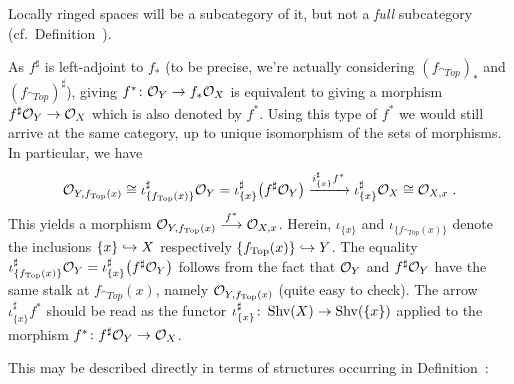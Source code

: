 \documentclass[a4paper,parskip=half,numbers=enddot, DIV=12]{scrreprt}
\begin{document}
\begin{rem*}
    Locally ringed spaces will be a subcategory of it, but not a \emph{full} subcategory (cf.\ Definition~).
\end{rem*}
\begin{rem*}
    As $f^\sharp$ is left-adjoint to $f_*$ (to be precise, we're actually considering  $(f_{\cat{Top}})_*$ and $(f_{\cat{Top}})^\sharp$), giving $f^*\colon \mathcal{O}_Y\to f_*\mathcal{O}_X$ is equivalent to giving a morphism $f^\sharp \mathcal{O}_Y \to \mathcal{O}_X$ which is also denoted by $f^*$. Using this type of $f^*$ we would still arrive at the same category, up to unique isomorphism of the sets of morphisms. In particular, we have 
    \begin{align*}
    	\mathcal{O}_{Y,f_{\operatorname{Top}}(x)} \cong \iota_{\{f_{\operatorname{Top}}(x)\}}^\sharp \mathcal{O}_Y = \iota_{\{x\}}^\sharp \big(f^\sharp \mathcal{O}_Y\big)  \xrightarrow{i^\sharp_{\{x\}}f^*} \iota^\sharp_{\{x\}} \mathcal{O}_X \cong \mathcal{O}_{X,x}\;. 
    \end{align*}
    This yields a morphism $\Oo_{Y,f_{\cat{Top}}(x)} \morphism[f^*] \Oo_{X,x}$. Herein, $\iota_{\{x\}}$ and $\iota_{\{f_{\cat{Top}}(x)\}}$ denote the inclusions $\{x\}\monomorphism X$ respectively $\{f_{\cat{Top}}(x)\}\monomorphism Y$. The equality $\iota_{\{f_{\operatorname{Top}}(x)\}}^\sharp \mathcal{O}_Y = \iota_{\{x\}}^\sharp \big(f^\sharp \mathcal{O}_Y\big)$ follows from the fact that $\mathcal{O}_Y$ and $f^\sharp\mathcal{O}_Y$ have the same stalk at $f_{\cat{Top}}(x)$, namely $\mathcal{O}_{Y,f_{\operatorname{Top}}(x)}$ (quite easy to check). The arrow $\iota_{\{x\}}^\sharp f^*$ should be read as the functor $\iota_{\{x\}}^\sharp\colon\cat{Shv}(X)\morphism\cat{Shv}(\{x\})$ applied to the morphism $f^*\colon f^\sharp\Oo_Y\morphism\Oo_X$.
    
    This may be described directly in terms of structures occurring in Definition~:
\end{rem*}
\end{document}
